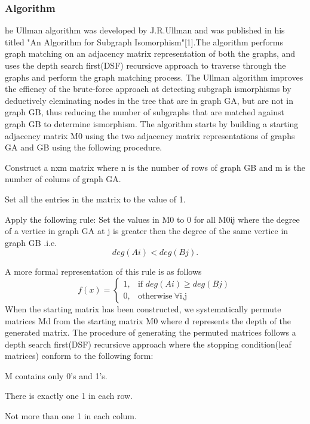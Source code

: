 \subsubsection{Algorithm}
he Ullman algorithm was developed by J.R.Ullman and was published in his titled "An Algorithm for Subgraph Isomorphism"[1].The algorithm performs graph matching on an adjacency matrix representation of both the graphs, and uses the depth search first(DSF) recursicve approach to traverse through the graphs and perform
the graph matching process. The Ullman algorithm improves the effiency of the brute-force approach at detecting subgraph ismorphisms by deductively eleminating nodes in the tree that are in graph G{\tiny A}, but are not in graph G{\tiny B}, thus reducing the number of subgraphs that are matched against graph G{\tiny B}
to determine ismorphism.\newline\newline
The algorithm starts by building a starting adjacency matrix M0 using the two adjacency matrix representations of graphs G{\tiny A} and G{\tiny B} using the following procedure.
\begin{myEnumerate}
\item Construct a nxm matrix where n is the number of rows of graph G{\tiny B} and m is the number of colums of graph G{\tiny A}.
\item Set all the entries in the matrix to the value of 1.
\item Apply the following rule:
	Set the values in M0 to 0 for all M0ij where the degree of a vertice in graph G{\tiny A} at j is greater then the degree of the same vertice in graph G{\tiny B} .i.e. 
	\begin{equation}
		deg(Ai) < deg(Bj). 
	\end{equation}

\end{myEnumerate}
	A more formal representation of this rule is as follows
	\[
		f(x)= 
			\begin{cases}
				1,& \text{if } deg(Ai)\geq deg(Bj)\\ 
				0,              & \text{otherwise}\   \forall \text{i,j}
			\end{cases}
	\]
When the starting matrix has been constructed, we systematically permute matrices Md from the starting matrix M0 where d represents the depth of the generated matrix. The procedure of 
generating the permuted matrices follows a depth search first(DSF) recursicve approach where the stopping condition(leaf matrices) conform to the following form:
\begin{myEnumerate}
\item M contains only 0's and 1's.
\item There is exactly one 1 in each row.
\item Not more than one 1 in each colum.
\end{myEnumerate}


